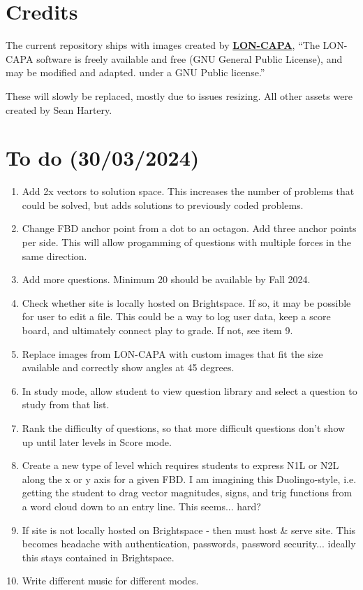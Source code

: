 \documentclass[12pt]{article}
\let\oldhref\href
\renewcommand{\href}[2]{\oldhref{#1}{\bfseries#2}}
\begin{document}
\section{Credits}
The current repository ships with images created by \href{https://www.lon-capa.org/index.html}{LON-CAPA}, ``The LON-CAPA software is freely available and free (GNU General Public License), and may be modified and adapted. under a GNU Public license.''\par

These will slowly be replaced, mostly due to issues resizing. All other assets were created by Sean Hartery.

\section{To do (30/03/2024)}
\begin{enumerate}[leftmargin=*,noitemsep]
\item Add 2x vectors to solution space. This increases the number of problems that could be solved, but adds solutions to previously coded problems.
\item Change FBD anchor point from a dot to an octagon. Add three anchor points per side. This will allow progamming of questions with multiple forces in the same direction.
\item Add more questions. Minimum 20 should be available by Fall 2024.
\item Check whether site is locally hosted on Brightspace. If so, it may be possible for user to edit a file. This could be a way to log user data, keep a score board, and ultimately connect play to grade. If not, see item 9.
\item Replace images from LON-CAPA with custom images that fit the size available and correctly show angles at 45 degrees.
\item In study mode, allow student to view question library and select a question to study from that list.
\item Rank the difficulty of questions, so that more difficult questions don't show up until later levels in Score mode.
\item Create a new type of level which requires students to express N1L or N2L along the x or y axis for a given FBD. I am imagining this Duolingo-style, i.e. getting the student to drag vector magnitudes, signs, and trig functions from a word cloud down to an entry line. This seems... hard?
\item If site is not locally hosted on Brightspace - then must host \& serve site. This becomes headache with authentication, passwords, password security... ideally this stays contained in Brightspace.
\item Write different music for different modes.
\end{enumerate}
\end{document}
